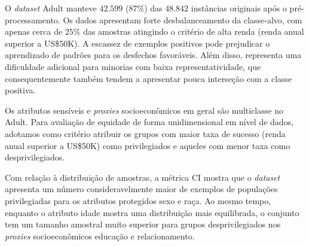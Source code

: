 O \textit{dataset} Adult manteve $42.599$ ($87\%$) das $48.842$ instâncias originais após o pré-processamento. Os dados apresentam forte desbalanceamento da classe-alvo, com apenas cerca de $25\%$ das amostras atingindo o critério de alta renda (renda anual superior a US\$50K). A escassez de exemplos positivos pode prejudicar o aprendizado de padrões para os desfechos favoráveis. Além disso, representa uma dificuldade adicional para minorias com baixa representatividade, que consequentemente também tendem a apresentar pouca interseção com a classe positiva.

Os atributos sensíveis e \textit{proxies} socioeconômicos em geral são multiclasse no Adult. Para avaliação de equidade de forma unidimensional em nível de dados, adotamos como critério atribuir os grupos com maior taxa de sucesso (renda anual superior a US\$50K) como privilegiados e aqueles com menor taxa como desprivilegiados.

\begin{table}[H]
    \centering
    \caption{Métricas dinâmicas de viés avaliadas por atributo sensível (Adult).}
    \vspace{2mm}
    \label{tab:adult_dynamic_metrics}
\end{table}

Com relação à distribuição de amostras, a métrica CI mostra que o \textit{dataset} apresenta um número consideravelmente maior de exemplos de populações privilegiadas para os atributos protegidos sexo e raça. Ao mesmo tempo, enquanto o atributo idade mostra uma distribuição mais equilibrada, o conjunto tem um tamanho amostral muito superior para grupos desprivilegiados nos \textit{proxies} socioeconômicos educação e relacionamento.

